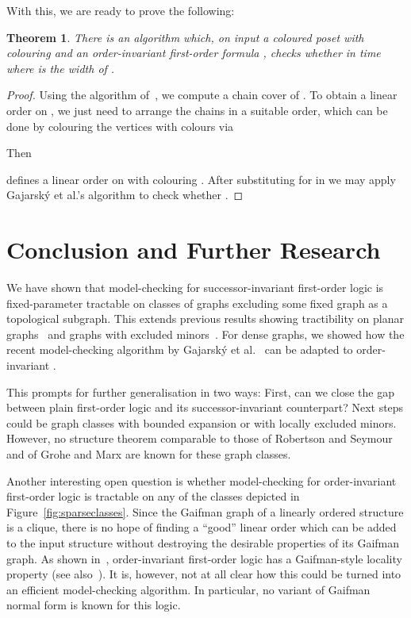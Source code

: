 \documentclass[12pt]{amsart}
\newtheorem{theorem}{Theorem}[section]
\begin{document}
With this, we are ready to prove the following:
\begin{theorem}
  There is an algorithm which, on input a coloured poset 
  with colouring  and an order-invariant
  first-order formula , checks whether  in
  time  where  is the width of
  .
\end{theorem}
\begin{proof}
  Using the algorithm of~\cite{felsner2003recognition}, we compute a
  chain cover  of . To obtain a linear
  order on , we just need to arrange the chains in a suitable
  order, which can be done by colouring the vertices with colours
   via
  
  Then
  
  defines a linear order on  with colouring
  . After substituting  for  in
   we may apply Gajarský et al.'s algorithm to check whether
  .
\end{proof}


\section*{Conclusion and Further Research}

We have shown that model-checking for successor-invariant first-order
logic is fixed-parameter tractable on classes of graphs excluding some
fixed graph  as a topological subgraph. This extends previous
results showing tractibility on planar graphs~\cite{EngelmannKS12} and
graphs with excluded minors~\cite{ekk13}. For dense graphs, we showed
how the recent model-checking algorithm by Gajarský et
al.~\cite{gajarsky2015fo} can be adapted to order-invariant .

This prompts for further generalisation in two ways: First, can we
close the gap between plain first-order logic and its
successor-invariant counterpart? Next steps could be graph classes
with bounded expansion or with locally excluded minors. However, no
structure theorem comparable to those of Robertson and Seymour and of
Grohe and Marx are known for these graph classes.

Another interesting open question is whether model-checking for
order-invariant first-order logic is tractable on any of the classes
depicted in Figure~\ref{fig:sparseclasses}. Since the Gaifman graph of
a linearly ordered structure is a clique, there is no hope of finding
a ``good'' linear order which can be added to the input structure
without destroying the desirable properties of its Gaifman graph. As
shown in~\cite{GroheS00}, order-invariant first-order logic has a
Gaifman-style locality property (see also~\cite{AndersonMSS12}). It
is, however, not at all clear how this could be turned into an
efficient model-checking algorithm. In particular, no variant of
Gaifman normal form is known for this logic.
\end{document}

